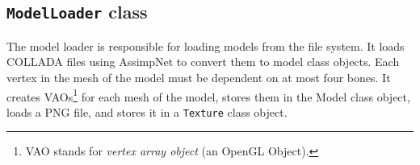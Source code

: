 \subsection{\texttt{ModelLoader} class}\label{subsec:model_loader-class}

The model loader is responsible for loading models from the file system.
It loads COLLADA files using AssimpNet to convert them to model class objects.
Each vertex in the mesh of the model must be dependent on at most four bones.
It creates VAOs\footnote{VAO stands for \textit{vertex array object} (an OpenGL Object).} for each mesh of the model, stores them in the Model class object, loads a PNG file, and stores it in a \texttt{Texture} class object.
